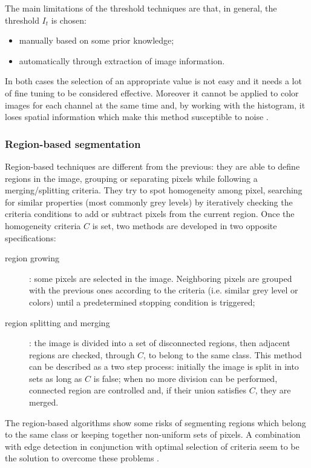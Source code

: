 \documentclass[../main.tex]{subfiles}
\begin{document}
The main limitations of the threshold techniques are that, in general, the threshold $I_{t}$ is chosen:
\begin{itemize}
    \item manually based on some prior knowledge;
    \item automatically through extraction of image information.
\end{itemize}
In both cases the selection of an appropriate value is not easy and it needs a lot of fine tuning to be considered effective\cite{automated_segm_tech}. Moreover it cannot be applied to color images for each channel at the same time and, by working with the histogram, it loses spatial information which make this method susceptible to noise \cite{segmentation_review_1}.

\subsubsection{\large{Region-based segmentation}}

Region-based techniques are different from the previous: they are able to define regions in the image, grouping or separating pixels while following a merging/splitting criteria\cite{kaganami2009region-based}.
They try to spot homogeneity among pixel, searching for similar properties (most commonly grey levels) by iteratively checking the criteria conditions to add or subtract pixels from the current region.
Once the homogeneity criteria $C$ is set, two methods are developed in two opposite specifications:
\begin{description}
\item[region growing] :  some  pixels are selected in the image. 
Neighboring pixels are grouped with the previous ones according to the criteria (i.e. similar grey level or colors) until a predetermined stopping condition is triggered;
\item[region splitting and merging] : the image is divided into a set of disconnected regions, then adjacent regions are checked, through $C$, to belong to the same class\cite{segmentation_review_1}.
This method can be described as a two step process: initially the image is split in  
into sets as long as $C$ is false; when no more division can be performed, connected region are controlled and, if their union satisfies $C$, they are merged. 
\end{description}

The region-based algorithms show some risks of segmenting regions which belong to the same class or keeping together non-uniform sets of pixels. A combination with edge detection in conjunction with optimal selection of criteria seem to be the solution to overcome these problems \cite{automated_segm_tech}.
\end{document}
